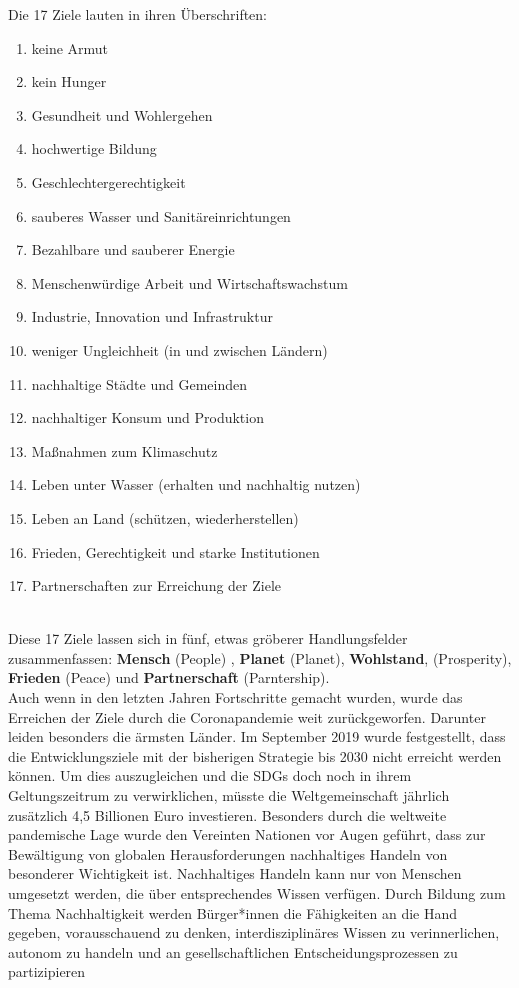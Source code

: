 \documentclass[letterpaper]{article}
\begin{document}
Die 17 Ziele lauten in ihren Überschriften: \cite{Agenda2030}
 \begin{enumerate}
     \item keine Armut
     \item kein Hunger 
     \item Gesundheit und Wohlergehen 
     \item hochwertige Bildung 
     \item Geschlechtergerechtigkeit 
     \item sauberes Wasser und Sanitäreinrichtungen 
     \item Bezahlbare und sauberer Energie 
     \item Menschenwürdige Arbeit und Wirtschaftswachstum 
     \item Industrie, Innovation und Infrastruktur
     \item weniger Ungleichheit (in und zwischen Ländern)
     \item nachhaltige Städte und Gemeinden
     \item nachhaltiger Konsum und Produktion 
     \item Maßnahmen zum Klimaschutz
     \item Leben unter Wasser (erhalten und nachhaltig nutzen)
     \item Leben an Land (schützen, wiederherstellen)
     \item Frieden, Gerechtigkeit und starke Institutionen 
     \item Partnerschaften zur Erreichung der Ziele
    
 \end{enumerate}\\
Diese 17 Ziele lassen sich in fünf, etwas gröberer Handlungsfelder zusammenfassen: \textbf{Mensch} (People) , \textbf{Planet} (Planet), \textbf{Wohlstand}, (Prosperity), \textbf{Frieden} (Peace) und \textbf{Partnerschaft} (Parntership).\\
Auch wenn in den letzten Jahren Fortschritte gemacht wurden, wurde das Erreichen der Ziele durch die Coronapandemie weit zurückgeworfen. Darunter leiden besonders die ärmsten Länder\cite{Agenda2030}. Im September 2019 wurde festgestellt, dass die Entwicklungsziele mit der bisherigen Strategie bis 2030 nicht erreicht werden können. Um dies auszugleichen und die SDGs doch noch in ihrem Geltungszeitrum zu verwirklichen, müsste die Weltgemeinschaft jährlich zusätzlich 4,5 Billionen Euro investieren. Besonders durch die weltweite pandemische Lage wurde den Vereinten Nationen vor Augen geführt, dass zur Bewältigung von globalen Herausforderungen nachhaltiges Handeln von besonderer Wichtigkeit ist\cite{Bericht}. Nachhaltiges Handeln kann nur von Menschen umgesetzt werden, die über entsprechendes Wissen verfügen. Durch Bildung zum Thema Nachhaltigkeit werden Bürger*innen die Fähigkeiten an die Hand gegeben, vorausschauend zu denken, interdisziplinäres Wissen zu verinnerlichen, autonom zu handeln und an gesellschaftlichen Entscheidungsprozessen zu partizipieren\cite{BNE}\\
\end{document}

